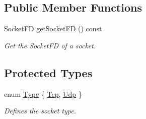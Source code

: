 \subsection*{Public Member Functions}
\begin{DoxyCompactItemize}
\item 
Socket\-F\-D \hyperlink{classmognetwork_1_1_socket_a6fc34e842d4efbd526697a12e826806a}{get\-Socket\-F\-D} () const 
\begin{DoxyCompactList}\small\item\em Get the Socket\-F\-D of a socket. \end{DoxyCompactList}\end{DoxyCompactItemize}
\subsection*{Protected Types}
\begin{DoxyCompactItemize}
\item 
enum \hyperlink{classmognetwork_1_1_socket_a70fb1fd697cfe89987e81bbe9db8ea4d}{Type} \{ \hyperlink{classmognetwork_1_1_socket_a70fb1fd697cfe89987e81bbe9db8ea4dad6adab633c51e7fd9780763f821bea67}{Tcp}, 
\hyperlink{classmognetwork_1_1_socket_a70fb1fd697cfe89987e81bbe9db8ea4dac91debddee39f30455177839f94bdde6}{Udp}
 \}
\begin{DoxyCompactList}\small\item\em Defines the socket type. \end{DoxyCompactList}\end{DoxyCompactItemize}
